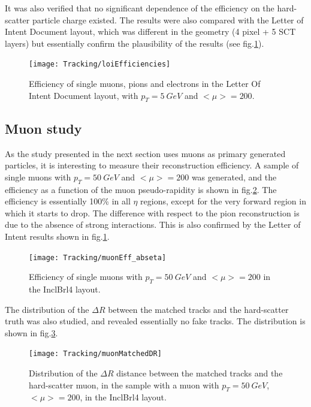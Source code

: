 \documentclass[a4paper,twoside,12pt]{article}
\begin{document}
It was also verified that no significant dependence of the efficiency on the hard-scatter particle charge existed. The results were also compared with
the Letter of Intent Document\cite{loi} layout, which was different in the geometry (4 pixel + 5 SCT layers) but essentially confirm the plausibility of the results (see fig.\ref{fig:tracking:loiEfficiencies}).

\begin{figure}
\centering
\texttt{[image: Tracking/loiEfficiencies]}
\caption{Efficiency of single muons, pions and electrons in the Letter Of Intent Document\cite{loi} layout, with $p_{T} = 5\ GeV$ and $<\mu> = 200$.}
\label{fig:tracking:loiEfficiencies}
\end{figure} 


\subsection{Muon study}
As the study presented
in the next section uses muons as primary generated particles, it is interesting to measure their reconstruction efficiency. A sample of 
single muons with $p_{T} = 50\ GeV$ and $<\mu> = 200$ was generated, and the efficiency as a function of the muon pseudo-rapidity is
shown in fig.\ref{fig:tracking:muonEff_abseta}. The efficiency is essentially 100\% in all $\eta$ regions, except for the very forward region in which it starts to drop.
The difference with respect to the pion reconstruction is due to the absence of strong interactions. This is also confirmed by the Letter of Intent\cite{loi} results shown in fig.\ref{fig:tracking:loiEfficiencies}.\\

\begin{figure}
\centering
\texttt{[image: Tracking/muonEff\_abseta]}
\caption{Efficiency of single muons with $p_{T} = 50\ GeV$ and $<\mu> = 200$ in the InclBrl4 layout.}
\label{fig:tracking:muonEff_abseta}
\end{figure} 

The distribution of the $\Delta R$ between the matched tracks and the hard-scatter truth was also studied, and revealed essentially no fake tracks. The distribution is
shown in fig.\ref{fig:tracking:muonMatchedDR}.

\begin{figure}
\centering
\texttt{[image: Tracking/muonMatchedDR]}
\caption{Distribution of the $\Delta R$ distance between the matched tracks and the hard-scatter muon, in the sample with a muon with $p_{T} = 50\ GeV$, $<\mu> = 200$, in the InclBrl4 layout.}
\label{fig:tracking:muonMatchedDR}
\end{figure} 
\end{document}

